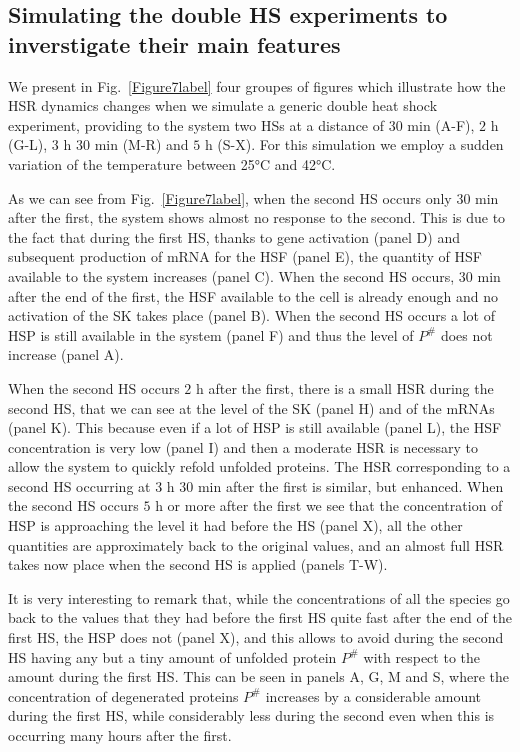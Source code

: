 \documentclass[oneside, 10pt, a4paper, twocolumn]{article}
\begin{document}
\subsection{Simulating the double HS experiments to inverstigate their main features}
\label{Sec2HSsimulations}

We present in Fig.~\ref{Figure7label} four groupes of figures which illustrate how the HSR dynamics changes when we simulate a generic double heat shock experiment, providing to the system two HSs at a distance of $30$ min (A-F), $2$ h (G-L), $3$ h $30$ min (M-R) and $5$ h (S-X). For this simulation we employ a sudden variation of the temperature between 25°C and 42°C.

As we can see from Fig.~\ref{Figure7label}, when the second HS occurs only $30$ min after the first, the system shows almost no response to the second. This is due to the fact that during the first HS, thanks to gene activation (panel D) and subsequent production of mRNA for the HSF (panel E), the quantity of HSF available to the system increases (panel C). When the second HS occurs, $30$ min after the end of the first, the HSF available to the cell is already enough and no activation of the SK takes place (panel B). When the second HS occurs a lot of HSP is still available in the system (panel F) and thus the level of $P^\#$ does not increase (panel A).

When the second HS occurs $2$ h after the first, there is a small HSR during the second HS, that we can see at the level of the SK (panel H) and of the mRNAs (panel K). This because even if a lot of HSP is still available (panel L), the HSF concentration is very low (panel I) and then a moderate HSR is necessary to allow the system to quickly refold unfolded proteins. 
The HSR corresponding to a second HS occurring at $3$ h $30$ min after the first is similar, but enhanced. 
When the second HS occurs $5$ h or more after the first we see that the concentration of HSP is approaching the level it had before the HS (panel X), all the other quantities are approximately back to the original values, and an almost full HSR takes now place when the second HS is applied (panels T-W). 

It is very interesting to remark that, while the concentrations of all the species go back to the values that they had before the first HS quite fast after the end of the first HS, the HSP does not (panel X), and this allows to avoid during the second HS having any but a tiny amount of unfolded protein $P^\#$ with respect to the amount during the first HS. This can be seen in panels A, G, M and S, where the concentration of degenerated proteins $P^\#$ increases by a considerable amount during the first HS, while considerably less during the second even when this is occurring many hours after the first. %
\end{document}
